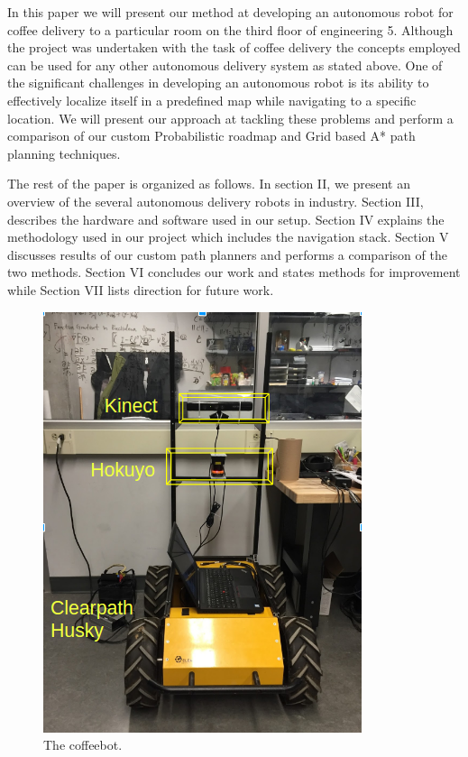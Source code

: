 \documentclass[letterpaper, 10 pt, conference]{ieeeconf}  %
\begin{document}
In this paper we will present our method at developing an autonomous robot for coffee delivery to a particular room on the third floor of engineering 5. Although the project was undertaken with the task of coffee delivery the concepts employed can be used for any other autonomous delivery system as stated above. One of the significant challenges in developing an autonomous robot is its ability to effectively localize itself in a predefined map while navigating to a specific location. We will present our approach at tackling these problems and perform a comparison of our custom Probabilistic roadmap and Grid based A* path planning techniques.

The rest of the paper is organized as follows. In section II, we present an overview of the several autonomous delivery robots in industry. Section III, describes the hardware and software used in our setup. Section IV explains the methodology used in our project which includes the navigation stack. Section V discusses results of our custom path planners and performs a comparison of the two methods. Section VI concludes our work and states methods for improvement while Section VII lists direction for future work.

\begin{figure}[!ht]
	\centering
	\includegraphics[width=1.0\columnwidth]{Figures/hardware_setup}
	\caption{The coffeebot.}
	\label{hardware}
\end{figure}
\end{document}
